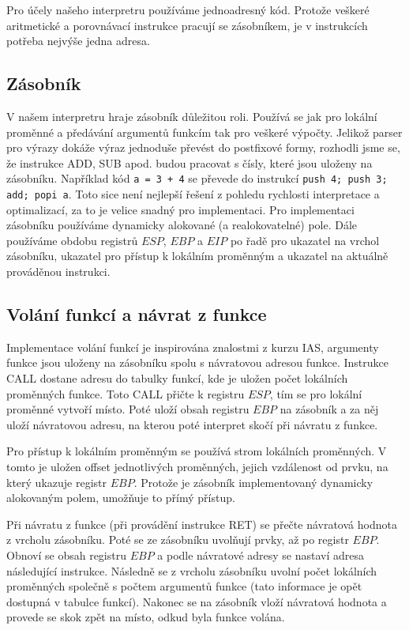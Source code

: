 \documentclass[a4paper,11pt,titlepage]{article}
\begin{document}
Pro účely našeho interpretru používáme jednoadresný kód. Pro\-to\-že veškeré aritmetické a porovnávací instrukce pracují se zásobníkem, je v instrukcích potřeba nejvýše jedna adresa.

\subsection{Zásobník}

V našem interpretru hraje zásobník důležitou roli. Používá se jak pro lokální proměnné a předávání argumentů funkcím tak pro veškeré výpočty. Jelikož parser pro výrazy dokáže výraz jednoduše převést do postfixové formy, rozhodli jsme se, že instrukce ADD, SUB apod. budou pracovat s čísly, které jsou uloženy na zásobníku. Například kód {\tt a = 3 + 4} se převede do instrukcí {\tt push 4; push 3; add; popi a}. Toto sice není nejlepší řešení z pohledu rychlosti interpretace a optimalizací, za to je velice snadný pro implementaci. Pro implementaci zásobníku používáme dynamicky alokované (a realokovatelné) pole. Dále používáme obdobu registrů $ESP$, $EBP$ a $EIP$ po řadě pro ukazatel na vrchol zásobníku, ukazatel pro přístup k lokálním proměnným a ukazatel na aktuálně prováděnou instrukci.

\subsection{Volání funkcí a návrat z funkce}

Implementace volání funkcí je inspirována znalostmi z kurzu IAS, argumenty funkce jsou uloženy na zásobníku spolu s návratovou adresou funkce. Instrukce CALL dostane adresu do tabulky funkcí, kde je uložen počet lokálních pro\-měn\-ných funkce. Toto CALL přičte k registru $ESP$, tím se pro lokální proměnné vytvoří místo. Poté uloží obsah registru $EBP$ na zásobník a za něj uloží návratovou adresu, na kterou poté interpret skočí při návratu z funkce.


Pro přístup k lokálním proměnným se používá strom lokálních pro\-měn\-ných. V tomto je uložen offset jednotlivých proměnných, jejich vzdálenost od prvku, na který ukazuje registr $EBP$. Protože je zásobník implementovaný dynamicky alokovaným polem, umožňuje to přímý přístup.


Při návratu z funkce (při provádění instrukce RET) se přečte návratová hodnota z vrcholu zásobníku. Poté se ze zásobníku uvolňují prvky, až po registr $EBP$. Obnoví se obsah registru $EBP$ a podle návratové adresy se nastaví adresa následující instrukce. Následně se z vrcholu zásobníku uvolní počet lokálních proměnných společně s počtem argumentů funkce (tato informace je opět dostupná v tabulce funkcí). Nakonec se na zásobník vloží návratová hodnota a provede se skok zpět na místo, odkud byla funkce volána.
\end{document}
